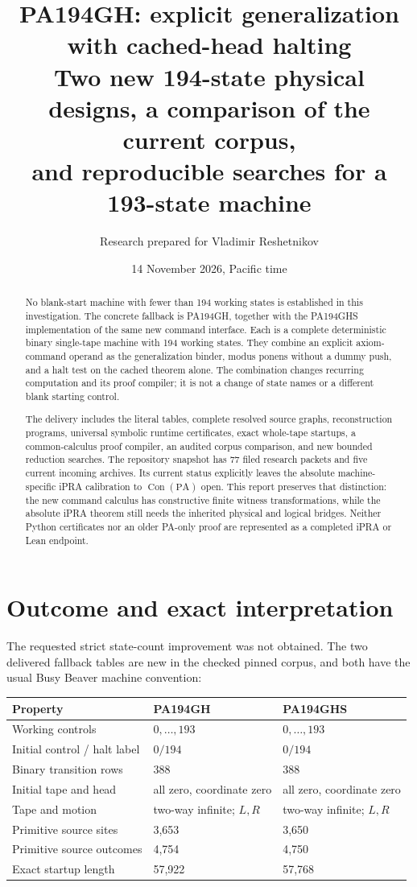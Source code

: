 \documentclass[11pt,letterpaper]{article}
\title{PA194GH: explicit generalization with cached-head halting\\[5pt]
\large Two new 194-state physical designs, a comparison of the current corpus,\\
and reproducible searches for a 193-state machine}
\author{Research prepared for Vladimir Reshetnikov}
\date{14 November 2026, Pacific time}
\newcommand{\PA}{\mathrm{PA}}
\newcommand{\Con}{\operatorname{Con}}
\begin{document}
\maketitle
\begin{abstract}
No blank-start machine with fewer than 194 working states is established in
this investigation. The concrete fallback is PA194GH, together with the
PA194GHS implementation of the same new command interface. Each is a
complete deterministic binary single-tape machine with 194 working states.
They combine an explicit axiom-command operand as the generalization binder,
modus ponens without a dummy push, and a halt test on the cached theorem
alone. The combination changes recurring computation and its proof compiler;
it is not a change of state names or a different blank starting control.

The delivery includes the literal tables, complete resolved source graphs,
reconstruction programs, universal symbolic runtime certificates, exact
whole-tape startups, a common-calculus proof compiler, an audited corpus
comparison, and new bounded reduction searches. The repository snapshot has
77 filed research packets and five current incoming archives. Its current
status explicitly leaves the absolute machine-specific iPRA calibration to
$\Con(\PA)$ open. This report preserves that distinction: the new command
calculus has constructive finite witness transformations, while the absolute
iPRA theorem still needs the inherited physical and logical bridges. Neither
Python certificates nor an older PA-only proof are represented as a completed
iPRA or Lean endpoint.
\end{abstract}
\tableofcontents
\newpage

\section{Outcome and exact interpretation}
\label{sec:outcome}

The requested strict state-count improvement was not obtained. The two
delivered fallback tables are new in the checked pinned corpus, and both
have the usual Busy Beaver machine convention:

\begin{center}
\begin{tabular}{@{}lll@{}}
\toprule
Property & PA194GH & PA194GHS\\
\midrule
Working controls & $0,\ldots,193$ & $0,\ldots,193$\\
Initial control / halt label & $0/194$ & $0/194$\\
Binary transition rows & 388 & 388\\
Initial tape and head & all zero, coordinate zero & all zero, coordinate zero\\
Tape and motion & two-way infinite; $L,R$ & two-way infinite; $L,R$\\
Primitive source sites & 3,653 & 3,650\\
Primitive source outcomes & 4,754 & 4,750\\
Exact startup length & 57,922 & 57,768\\
\bottomrule
\end{tabular}
\end{center}
\end{document}

